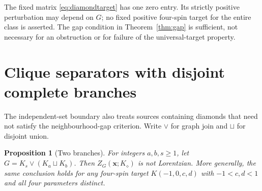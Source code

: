 \documentclass[11pt]{article}
\newtheorem{proposition}[theorem]{Proposition}
\theoremstyle{remark}
\begin{document}
The fixed matrix \eqref{eq:diamondtarget} has one zero entry.
Its strictly positive perturbation may depend on $G$; no fixed
positive four-spin target for the entire class is asserted.
The gap condition in Theorem~\ref{thm:gap} is sufficient, not
necessary for an obstruction or for failure of the universal-target
property.

\section{Clique separators with disjoint complete branches}
The independent-set boundary also treats sources containing diamonds
that need not satisfy the neighbourhood-gap criterion. Write $\vee$
for graph join and $\sqcup$ for disjoint union.

\begin{proposition}[Two branches]\label{prop:twocliques}
For integers $a,b,s\geq1$, let $G=K_s\vee(K_a\sqcup K_b)$.
Then $Z_G(\mathbf x;K_{\diamond})$ is not Lorentzian.
More generally, the same conclusion holds for any four-spin target
$K(-1,0,c,d)$ with $-1<c,d<1$ and all four parameters distinct.
\end{proposition}
\end{document}
